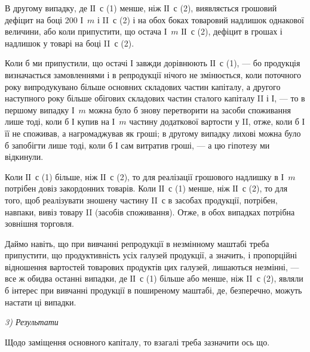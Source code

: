 В другому випадку, де ІІ~$с$ (1) менше, ніж ІІ~$с$ (2), виявляється грошовий
дефіцит на боці 200 І~$m$ і II~$с$ (2) і на обох боках товаровий надлишок
однакової величини, або коли припустити, що остача І~$m$ \deq{} ІІ~$с$ (2), дефіцит
в грошах і надлишок у товарі на боці II~$с$ (2).

Коли б ми припустили, що остачі І завжди дорівнюють ІІ~$с$ (1), — бо
продукція визначається замовленнями і в репродукції нічого не змінюється,
коли поточного року випродукувано більше основних складових частин
капіталу, а другого наступного року більше обігових складових частин
сталого капіталу II і І, — то в першому випадку І~$m$ можна було б знову
перетворити на засоби споживання лише тоді, коли б І купив на І~$m$
частину додаткової вартости у II, отже, коли б І її не споживав, а нагромаджував
як гроші; в другому випадку лихові можна було б запобігти
лише тоді, коли б І сам витратив гроші, — а цю гіпотезу ми
відкинули.

Коли ІІ~$с$ (1) більше, ніж ІІ~$с$ (2), то для реалізації грошового надлишку
в І~$m$ потрібен довіз закордонних товарів. Коли ІІ~$с$ (1) менше, ніж ІІ~$с$
(2), то для того, щоб реалізувати зношену частину II~$с$ в засобах продукції,
потрібен, навпаки, вивіз товару II (засобів споживання). Отже, в
обох випадках потрібна зовнішня торговля.

Даймо навіть, що при вивчанні репродукції в незмінному маштабі
треба припустити, що продуктивність усіх галузей продукції, а значить,
і пропорційні відношення вартостей товарових продуктів цих галузей,
лишаються незмінні, — все ж обидва останні випадки, де ІІ~$с$ (1) більше
або менше, ніж II~$с$ (2), являли б інтерес при вивчанні продукції в поширеному
маштабі, де, безперечно, можуть настати ці випадки.

\emph{3) Результати}  %


Щодо заміщення основного капіталу, то взагалі треба зазначити ось що.

